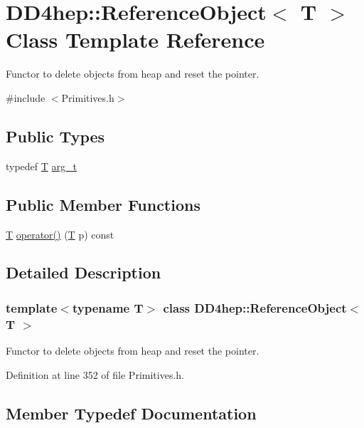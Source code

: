 \hypertarget{class_d_d4hep_1_1_reference_object}{}\section{D\+D4hep\+:\+:Reference\+Object$<$ T $>$ Class Template Reference}
\label{class_d_d4hep_1_1_reference_object}


Functor to delete objects from heap and reset the pointer.  




{\ttfamily \#include $<$Primitives.\+h$>$}

\subsection*{Public Types}
\begin{DoxyCompactItemize}
\item 
typedef \hyperlink{class_t}{T} \hyperlink{class_d_d4hep_1_1_reference_object_a7a8218bed56da484060ab742e31b46a9}{arg\+\_\+t}
\end{DoxyCompactItemize}
\subsection*{Public Member Functions}
\begin{DoxyCompactItemize}
\item 
\hyperlink{class_t}{T} \hyperlink{class_d_d4hep_1_1_reference_object_abf4b00d2143ecdd93812423ae41a6163}{operator()} (\hyperlink{class_t}{T} p) const
\end{DoxyCompactItemize}


\subsection{Detailed Description}
\subsubsection*{template$<$typename T$>$\newline
class D\+D4hep\+::\+Reference\+Object$<$ T $>$}

Functor to delete objects from heap and reset the pointer. 

Definition at line 352 of file Primitives.\+h.



\subsection{Member Typedef Documentation}
\hypertarget{class_d_d4hep_1_1_reference_object_a7a8218bed56da484060ab742e31b46a9}{}\label{class_d_d4hep_1_1_reference_object_a7a8218bed56da484060ab742e31b46a9} 
